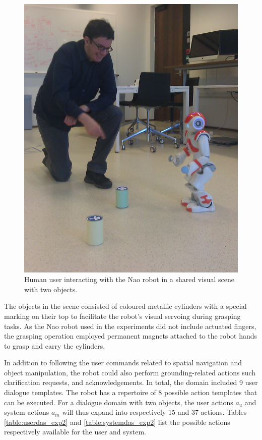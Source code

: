 \begin{figure}[h]
\begin{center}
\includegraphics[scale=0.12]{imgs/jonathon.jpg}
\end{center} 
\caption{Human user interacting with the Nao robot in a shared visual scene with two objects.}
\label{fig:naochap6}
\end{figure}

The objects in the scene consisted of coloured metallic cylinders with a special marking on their top to facilitate the robot's visual servoing during grasping tasks.  As the Nao robot used in the experiments did not include actuated fingers, the grasping operation employed permanent magnets attached to the robot hands to grasp and carry the cylinders.

In addition to following the user commands related to spatial navigation and object manipulation, the robot could also perform grounding-related actions such clarification requests, and acknowledgements. In total, the domain included 9 user dialogue templates.  The robot has a repertoire of 8 possible action templates that can be executed.  For a dialogue domain with two objects, the user actions $a_u$ and system actions $a_m$ will thus expand into respectively 15 and 37 actions.  Tables \ref{table:userdas_exp2} and \ref{table:systemdas_exp2} list the possible actions respectively available for the user and system.

